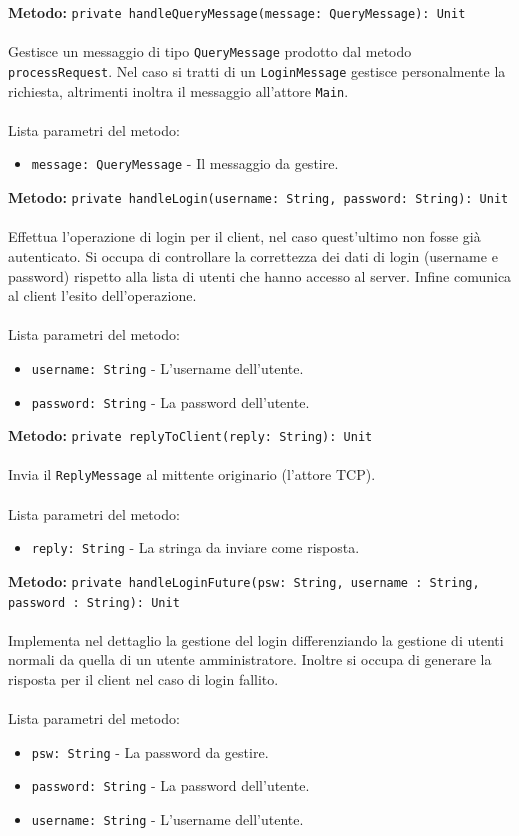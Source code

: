 \documentclass[a4paper]{article}
\begin{document}
		\textbf{Metodo: }\texttt{private handleQueryMessage(message: QueryMessage): Unit}
			\\ \\
			Gestisce un messaggio di tipo \texttt{QueryMessage} prodotto dal metodo \texttt{processRequest}. Nel caso si tratti di un \texttt{LoginMessage} gestisce personalmente la richiesta, altrimenti inoltra il messaggio all'attore \texttt{Main}.
			\\ \\
			Lista parametri del metodo:
			\begin{itemize}
				\item \texttt{message: QueryMessage} - Il messaggio da gestire.
			\end{itemize}
		\textbf{Metodo: }\texttt{private handleLogin(username: String, password: String): Unit}
			\\ \\
			Effettua l'operazione di login per il client, nel caso quest'ultimo non fosse già autenticato. Si occupa di controllare la correttezza dei dati di login (username e password) rispetto alla lista di utenti che hanno accesso al server. Infine comunica al client l'esito dell'operazione.
			\\ \\
			Lista parametri del metodo:
			\begin{itemize}
				\item \texttt{username: String} - L'username dell'utente.
				\item \texttt{password: String} - La password dell'utente.
			\end{itemize}
		\textbf{Metodo: }\texttt{private replyToClient(reply: String): Unit}
			\\ \\
			Invia il \texttt{ReplyMessage} al mittente originario (l'attore TCP).
			\\ \\
			Lista parametri del metodo:
			\begin{itemize}
				\item \texttt{reply: String} - La stringa da inviare come risposta.
			\end{itemize}
		\textbf{Metodo: }\texttt{private handleLoginFuture(psw: String, username : String, password : String): Unit}
			\\ \\
			Implementa nel dettaglio la gestione del login differenziando la gestione di utenti normali da quella di un utente amministratore. Inoltre si occupa di generare la risposta per il client nel caso di login fallito.
			\\ \\
			Lista parametri del metodo:
			\begin{itemize}
				\item \texttt{psw: String} - La password da gestire.
				\item \texttt{password: String} - La password dell'utente.
				\item \texttt{username: String} - L'username dell'utente.
			\end{itemize}
			
\end{document}
